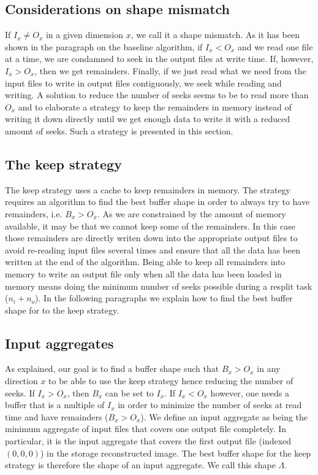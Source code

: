 \documentclass[conference]{IEEEtran}
\begin{document}
\subsection{Considerations on shape mismatch}
If $I_x \neq O_x$ in a given dimension $x$, we call it a shape mismatch. As it
has been shown in the paragraph on the baseline algorithm, if $I_x < O_x$ and
we read one file at a time, we are condamned to seek in the output files at
write time. If, however, $I_x > O_x$, then we get remainders. Finally, if we
just read what we need from the input files to write in output files
contiguously, we seek while reading and writing. A solution to reduce the
number of seeks seems to be to read more than $O_x$ and to elaborate a strategy
to keep the remainders in memory instead of writing it down directly until we
get enough data to write it with a reduced amount of seeks. Such a strategy is
presented in this section.

\subsection{The keep strategy}
The keep strategy uses a cache to keep remainders in memory.
The strategy requires an algorithm to find the best buffer shape in order to
always try to have remainders, i.e. $B_x>O_x$. As we are constrained by the
amount of memory available, it may be that we cannot keep some of the remainders.
In this case those remainders are directly writen down into the appropriate
output files to avoid re-reading input files several times and ensure that all
the data has been written at the end of the algorithm. Being able to keep all
remainders into memory to write an output file only when all the data has been
loaded in memory means doing the minimum number of seeks possible during a
resplit task ($n_i + n_o$). In the following paragraphs we explain how to find
the best buffer shape for to the keep strategy.

\subsection{Input aggregates}
As explained, our goal is to find a buffer shape such that $B_x>O_x$ in any
direction $x$ to be able to use the keep strategy hence reducing the number of
seeks. If $I_x > O_x$, then $B_x$ can be set to $I_x$. If $I_x < O_x$ however,
one needs a buffer that is a multiple of $I_x$ in order to minimize the number
of seeks at read time and have remainders ($B_x>O_x$). We define an input
aggregate as being the minimum aggregate of input files that covers one output
file completely. In particular, it is the input aggregate that covers the first
output file (indexed $(0,0,0)$) in the storage reconstructed image. The best
buffer shape for the keep strategy is therefore the shape of an input aggregate.
We call this shape $\Lambda$.
\end{document}

